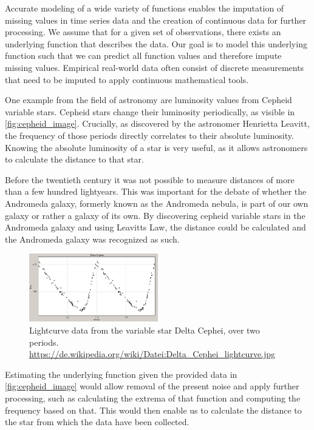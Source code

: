 Accurate modeling of a wide variety of functions enables the imputation of missing values in time series data and the creation of continuous data for further processing. We assume that for a given set of observations, there exists an underlying function that describes the data. Our goal is to model this underlying function such that we can predict all function values and therefore impute missing values. Empirical real-world data often consist of discrete measurements that need to be imputed to apply continuous mathematical tools.

One example from the field of astronomy are luminosity values from Cepheid variable stars. Cepheid stars change their luminosity periodically, as visible in \autoref{fig:cepheid_image}. Crucially, as discovered by the astronomer Henrietta Leavitt, the frequency of those periods directly correlates to their absolute luminosity. Knowing the absolute luminosity of a star is very useful, as it allows astronomers to calculate the distance to that star.

Before the twentieth century it was not possible to measure distances of more than a few hundred lightyears. This was important for the debate of whether the Andromeda galaxy, formerly known as the Andromeda nebula, is part of our own galaxy or rather a galaxy of its own. By discovering cepheid variable stars in the Andromeda galaxy and using Leavitts Law, the distance could be calculated and the Andromeda galaxy was recognized as such. \cite{gaßnerAstroBook}

\begin{figure}[h]
	\centering
	\includegraphics[width = 0.5\textwidth]{figures/Cephei}
	\caption{Lightcurve data from the variable star Delta Cephei, over two periods. \tiny\url{ https://de.wikipedia.org/wiki/Datei:Delta_Cephei_lightcurve.jpg}}
	\label{fig:cepheid_image}
\end{figure}

Estimating the underlying function given the provided data in \autoref{fig:cepheid_image} would allow removal of the present noise and apply further processing, such as calculating the extrema of that function and computing the frequency based on that. This would then enable us to calculate the distance to the star from which the data have been collected.

